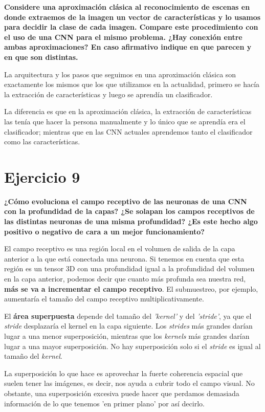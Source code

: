 \documentclass[11pt,a4paper]{article}
\begin{document}
\textbf{Considere una aproximación clásica al reconocimiento de escenas en donde extraemos de la imagen un vector de características y lo usamos para decidir la
clase de cada imagen. Compare este procedimiento con el uso de una CNN para el mismo problema. ¿Hay conexión entre ambas aproximaciones? En caso afirmativo indique
en que parecen y en que son distintas.}

La arquitectura y los pasos que seguimos en una aproximación clásica son exactamente los mismos que los que utilizamos en la actualidad, primero se hacía la
extracción de características y luego se aprendía un clasificador.

La diferencia es que en la aproximación clásica, la extracción de características las tenía que hacer la persona manualmente y lo único que se aprendía era el
clasificador; mientras que en las CNN actuales aprendemos tanto el clasificador como las características.


\section*{Ejercicio 9}

\textbf{¿Cómo evoluciona el campo receptivo de las neuronas de una CNN con la profundidad de la capas? ¿Se solapan los campos receptivos de las distintas neuronas de
una misma profundidad? ¿Es este hecho algo positivo o negativo de cara a un mejor funcionamiento?}

El campo receptivo es una región local en el volumen de salida de la capa anterior a la que está conectada una neurona. Si tenemos en cuenta que esta región es un tensor
3D con una profundidad igual a la profundidad del volumen en la capa anterior, podemos decir que cuanto más profunda sea nuestra red, \textbf{más se va a incrementar el
campo receptivo}. El submuestreo, por ejemplo, aumentaría el tamaño del campo receptivo multiplicativamente.

El \textbf{área superpuesta} depende del tamaño del \textit{'kernel'} y del \textit{'stride'}, ya que el \textit{stride} desplazaría el kernel en la capa siguiente.
Los \textit{strides} más grandes darían lugar a una menor superposición, mientras que los \textit{kernels} más grandes darían lugar a una mayor superposición. No hay
superposición solo si el \textit{stride} es igual al tamaño del \textit{kernel}.

La superposición lo que hace es aprovechar la fuerte coherencia espacial que suelen tener las imágenes, es decir, nos ayuda a cubrir todo el campo visual. No obstante,
una superposición excesiva puede hacer que perdamos demasiada información de lo que tenemos 'en primer plano' por así decirlo.
\end{document}
